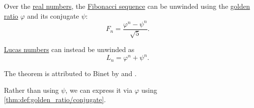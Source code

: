 \begin{theorem}\label{thm:binets_fibonacci_number_formula}
  Over the \hyperref[def:real_numbers]{real numbers}, the \hyperref[def:fibonacci_numbers]{Fibonacci sequence} can be unwinded using the \hyperref[def:golden_ratio]{golden ratio} \( \varphi \) and its conjugate \( \psi \):
  \begin{equation}\label{eq:thm:binets_formula/fibonacci}
    F_n = \frac {\varphi^n - \psi^n} {\sqrt 5}.
  \end{equation}

  \hyperref[def:lucas_numbers]{Lucas numbers} can instead be unwinded as
  \begin{equation}\label{eq:thm:binets_formula/lucas}
    L_n = \varphi^n + \psi^n.
  \end{equation}
\end{theorem}
\begin{comments}
  \item The theorem is attributed to Binet by \textcite[273]{Deza2012FigurateNumbers} and \textcite[exerc. 7.18]{ГашковЧубариков2005СложностьВычисления}.
  \item Rather than using \( \psi \), we can express it via \( \varphi \) using \cref{thm:def:golden_ratio/conjugate}.
\end{comments}
